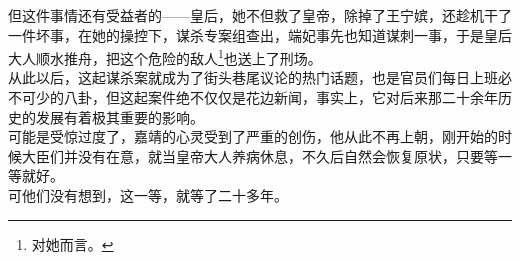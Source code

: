 \begin{multicols}{\theparacolNo}
但这件事情还有受益者的——皇后，她不但救了皇帝，除掉了王宁嫔，还趁机干了一件坏事，在她的操控下，谋杀专案组查出，端妃事先也知道谋刺一事，于是皇后大人顺水推舟，把这个危险的敌人\footnote{对她而言。}也送上了刑场。\\

从此以后，这起谋杀案就成为了街头巷尾议论的热门话题，也是官员们每日上班必不可少的八卦，但这起案件绝不仅仅是花边新闻，事实上，它对后来那二十余年历史的发展有着极其重要的影响。\\

可能是受惊过度了，嘉靖的心灵受到了严重的创伤，他从此不再上朝，刚开始的时候大臣们并没有在意，就当皇帝大人养病休息，不久后自然会恢复原状，只要等一等就好。\\

可他们没有想到，这一等，就等了二十多年。\\
\ifnum{}
	\end{multicols}
\fi
\newpage
